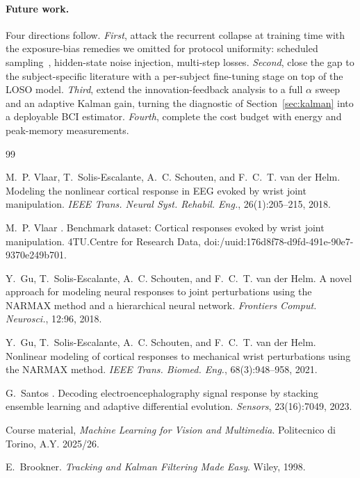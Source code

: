 \documentclass[10pt,twocolumn,letterpaper]{article}
\begin{document}
\paragraph{Future work.}
Four directions follow. \emph{First}, attack the recurrent collapse at
training time with the exposure-bias remedies we omitted for protocol
uniformity: scheduled sampling~\cite{CourseMaterial}, hidden-state noise
injection, multi-step losses. \emph{Second}, close the gap to the
subject-specific literature with a per-subject fine-tuning stage on top of
the LOSO model. \emph{Third}, extend the innovation-feedback analysis to a
full $\alpha$ sweep and an adaptive Kalman gain, turning the diagnostic of
Section~\ref{sec:kalman} into a deployable BCI estimator. \emph{Fourth},
complete the cost budget with energy and peak-memory measurements.

{\footnotesize
\begin{thebibliography}{99}
\setlength{\itemsep}{-1.5pt}\setlength{\parsep}{0pt}\setlength{\parskip}{0pt}

M.~P. Vlaar, T.~Solis-Escalante, A.~C. Schouten, and F.~C.~T. van der
Helm. Modeling the nonlinear cortical response in EEG evoked by wrist
joint manipulation. \textit{IEEE Trans. Neural Syst. Rehabil. Eng.},
26(1):205--215, 2018.

M.~P. Vlaar \etal. Benchmark dataset: Cortical responses evoked by wrist
joint manipulation. 4TU.Centre for Research Data,
doi:/\allowbreak uuid:\allowbreak 176d8f78-d9fd-491e-90e7-9370e249b701.

Y.~Gu, T.~Solis-Escalante, A.~C. Schouten, and F.~C.~T. van der Helm. A
novel approach for modeling neural responses to joint perturbations using
the NARMAX method and a hierarchical neural network. \textit{Frontiers
Comput. Neurosci.}, 12:96, 2018.

Y.~Gu, T.~Solis-Escalante, A.~C. Schouten, and F.~C.~T. van der Helm.
Nonlinear modeling of cortical responses to mechanical wrist
perturbations using the NARMAX method. \textit{IEEE Trans. Biomed. Eng.},
68(3):948--958, 2021.

G.~Santos \etal. Decoding electroencephalography signal response by
stacking ensemble learning and adaptive differential evolution.
\textit{Sensors}, 23(16):7049, 2023.

Course material, \textit{Machine Learning for Vision and Multimedia}.
Politecnico di Torino, A.Y. 2025/26.

E.~Brookner. \textit{Tracking and Kalman Filtering Made Easy}. Wiley,
1998.

\end{thebibliography}
}
\end{document}
